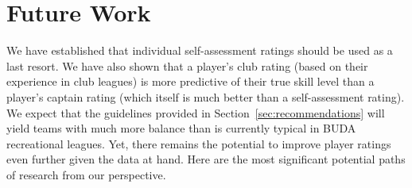 \section{Future Work}\label{sec:summary}

We have established that individual self-assessment ratings should be used as a last resort. We have also shown that a player's club rating (based on their experience in club leagues) is more predictive of their true skill level than a player's captain rating (which itself is much better than a self-assessment rating). We expect that the guidelines provided in Section~\ref{sec:recommendations} will yield teams with much more balance than is currently typical in BUDA recreational leagues. Yet, there remains the potential to improve player ratings even further given the data at hand. Here are the most significant potential paths of research from our perspective.

